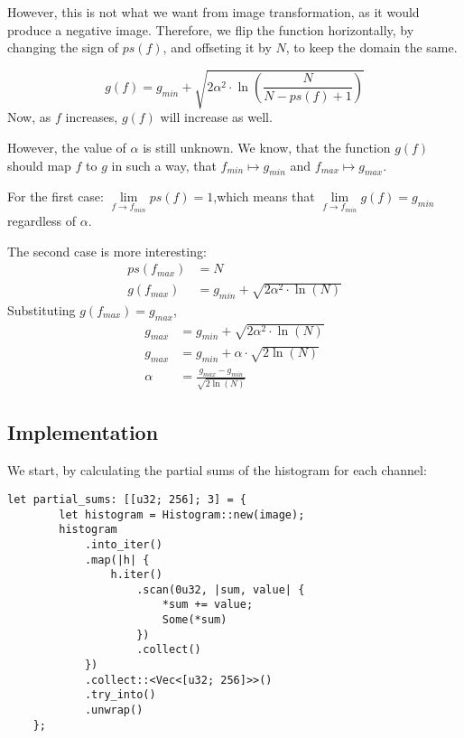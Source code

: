 \documentclass[12pt]{article}
\begin{document}
However, this is not what we want from image transformation, as it would produce a negative image.
Therefore, we flip the function horizontally, by changing the sign of $ps(f)$, and offseting it by $N$, to keep the domain the same.

\begin{equation}
    g(f) = g_{min} + \sqrt{
        2 \alpha^2 \cdot \ln
        \left(
        \frac{N}{N - ps(f) + 1}
        \right)}
    \label{eq:rayleigh-corrected}
\end{equation}
Now, as $f$ increases, $g(f)$ will increase as well.

However, the value of $\alpha$ is still unknown.
We know, that the function $g(f)$ should map $f$ to $g$ in such a way, that
$f_{min} \mapsto g_{min}$ and $f_{max} \mapsto g_{max}$.

For the first case:
\(
\lim\limits_{f \to f_{min}} ps(f) = 1
\),which means that
\(
\lim\limits_{f \to f_{min}} g(f) = g_{min}
\) regardless of $\alpha$.

The second case is more interesting:
\begin{align*}
    ps(f_{max}) & = N                \\[1ex]
    g(f_{max})  & = g_{min} + \sqrt{
        2 \alpha^2 \cdot \ln(N)
    }
\end{align*}
Substituting $g(f_{max}) = g_{max}$,
\begin{align}
    g_{max} & = g_{min} + \sqrt{
        2 \alpha^2 \cdot \ln(N)
    }\nonumber                                                                     \\[1ex]
    g_{max} & = g_{min} + \alpha \cdot \sqrt{2\ln(N)} \nonumber                    \\[1ex]
    \alpha  & = \frac{g_{max} - g_{min}}{\sqrt{2\ln(N)}} \label{eq:rayleigh-alpha}
\end{align}

\subsection{Implementation}

We start, by calculating the partial sums of the histogram for each channel:
\begin{lstlisting}
let partial_sums: [[u32; 256]; 3] = {
        let histogram = Histogram::new(image);
        histogram
            .into_iter()
            .map(|h| {
                h.iter()
                    .scan(0u32, |sum, value| {
                        *sum += value;
                        Some(*sum)
                    })
                    .collect()
            })
            .collect::<Vec<[u32; 256]>>()
            .try_into()
            .unwrap()
    };
\end{lstlisting}
\end{document}
